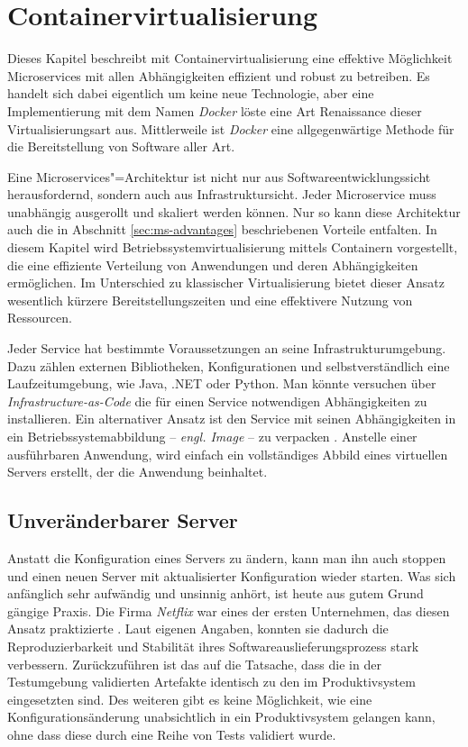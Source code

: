 \chapter{Containervirtualisierung}

Dieses Kapitel beschreibt mit Containervirtualisierung eine effektive Möglichkeit Microservices mit allen Abhängigkeiten effizient und robust zu betreiben. Es handelt sich dabei eigentlich um keine neue Technologie, aber eine Implementierung mit dem Namen \textit{Docker} löste eine Art Renaissance dieser Virtualisierungsart aus. Mittlerweile ist \textit{Docker} eine allgegenwärtige Methode für die Bereitstellung von Software aller Art.

Eine Microservices"=Architektur ist nicht nur aus Softwareentwicklungssicht herausfordernd, sondern auch aus Infrastruktursicht. Jeder Microservice muss unabhängig ausgerollt und skaliert werden können. Nur so kann diese Architektur auch die in Abschnitt \ref{sec:ms-advantages} beschriebenen Vorteile entfalten. In diesem Kapitel wird Betriebssystemvirtualisierung mittels Containern vorgestellt, die eine effiziente Verteilung von Anwendungen und deren Abhängigkeiten ermöglichen. Im Unterschied zu klassischer Virtualisierung bietet dieser Ansatz wesentlich kürzere Bereitstellungszeiten und eine effektivere Nutzung von Ressourcen.

Jeder Service hat bestimmte Voraussetzungen an seine Infrastrukturumgebung. Dazu zählen externen Bibliotheken, Konfigurationen und selbstverständlich eine Laufzeitumgebung, wie \zB Java, .NET oder Python. Man könnte versuchen über \textit{Infrastructure-as-Code} die für einen Service notwendigen Abhängigkeiten zu installieren. Ein alternativer Ansatz ist den Service mit seinen Abhängigkeiten in ein Betriebssystemabbildung -- \textit{engl. Image} -- zu verpacken \cite[113]{newman2015building}. Anstelle einer ausführbaren Anwendung, wird einfach ein vollständiges Abbild eines virtuellen Servers erstellt, der die Anwendung beinhaltet.

\section{Unveränderbarer Server}

Anstatt die Konfiguration eines Servers zu ändern, kann man ihn auch stoppen und einen neuen Server mit aktualisierter Konfiguration wieder starten. Was sich anfänglich sehr aufwändig und unsinnig anhört, ist heute aus gutem Grund gängige Praxis. Die Firma \textit{Netflix} war eines der ersten Unternehmen, das diesen Ansatz praktizierte \cite{NflxLegos}. Laut eigenen Angaben, konnten sie dadurch die Reproduzierbarkeit und Stabilität ihres Softwareauslieferungsprozess stark verbessern. Zurückzuführen ist das auf die Tatsache, dass die in der Testumgebung validierten Artefakte identisch zu den im Produktivsystem eingesetzten sind. Des weiteren gibt es keine Möglichkeit, wie eine Konfigurationsänderung unabsichtlich in ein Produktivsystem gelangen kann, ohne dass diese durch eine Reihe von Tests validiert wurde.


